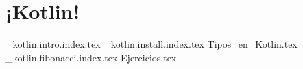 \chapter{¡Kotlin!}
  \begin{refsection}
    {_kotlin.intro.index.tex}
    {_kotlin.install.index.tex}
    {Tipos_en_Kotlin.tex}
    {_kotlin.fibonacci.index.tex}
    {Ejercicios.tex}
    \nocite{*}
    \printbibliography[keyword={kotlin}]
  \end{refsection}
  
